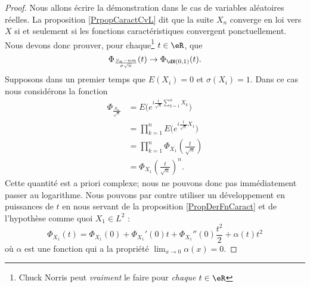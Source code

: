 \begin{proof}
    Nous allons écrire la démonstration dans le cas de variables aléatoires réelles. La proposition \ref{PrpopCaractCvL} dit que la suite \( X_n\) converge en loi vers \( X\) si et seulement si les fonctions caractéristiques convergent ponctuellement. Nous devons donc prouver, pour chaque\footnote{Chuck Norris peut \emph{vraiment} le faire pour \emph{chaque} $t\in\eR$} \( t\in\eR\), que
    \begin{equation}        \label{EqPhitophidNtznu}
        \Phi_{\frac{ S_n-nm }{ \sigma\sqrt{n} }}(t)\to\Phi_{\dN(0,1)}(t).
    \end{equation}
    Supposons dans un premier temps que \( E(X_i)=0\) et \( \sigma(X_i)=1\). Dans ce cas nous considérons la fonction 
    \begin{subequations}
        \begin{align}
            \Phi_{\frac{ S_n }{ \sqrt{n} }}&=E\big(  e^{i\frac{ t }{ \sqrt{n} }\sum_{k=1}^nX_k} \big)\\
            &=\prod_{k=1}^nE\big(  e^{i\frac{ t }{ \sqrt{n} }X_1} \big)\\
            &=\prod_{k=1}^n\Phi_{X_1}\left( \frac{ t }{ \sqrt{n} } \right)\\
            &=\Phi_{X_1}\left( \frac{ t }{ \sqrt{n} } \right)^n.
        \end{align}
    \end{subequations}
    Cette quantité est a priori complexe; nous ne pouvons donc pas immédiatement passer au logarithme. Nous pouvons par contre utiliser un développement en puissances de \( t\) en nous servant de la proposition \ref{PropDerFnCaract} et de l'hypothèse comme quoi \( X_1\in L^2\) :
    \begin{equation}
        \Phi_{X_1}(t)=\Phi_{X_1}(0)+\Phi_{X_1}'(0)t+\Phi_{X_1}''(0)\frac{ t^2 }{2}+\alpha(t)t^2
    \end{equation}
    où \( \alpha\) est une fonction qui a la propriété \( \lim_{x\to 0} \alpha(x)=0\).


\end{proof}
